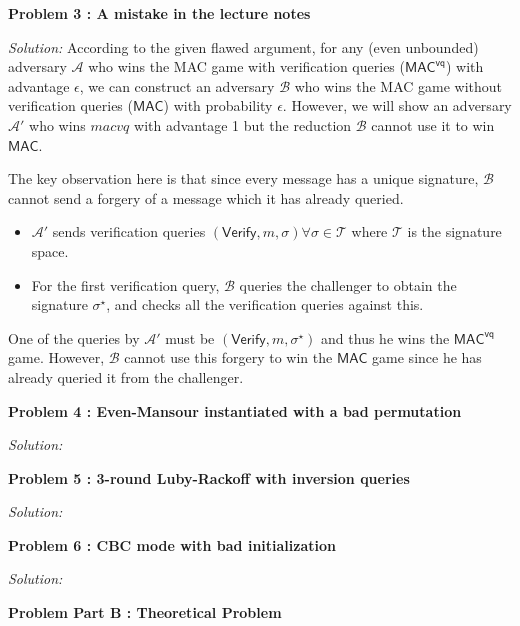 \documentclass[a4paper, 11pt]{article}
\newenvironment{solution}
    {\textit{Solution:}}
    {\clearpage}
\newcommand{\prob}[1]{\begin{mdframed}[backgroundcolor=gray!20] \textbf{Problem #1}\end{mdframed}}
\newcommand{\verify}{\mathsf{Verify}}
\newcommand{\macvq}{\mathsf{MAC^{vq}}}
\newcommand{\mac}{\mathsf{MAC}}
\newcommand{\calA}{\mathcal{A}}
\newcommand{\calB}{\mathcal{B}}
\newcommand{\calT}{\mathcal{T}}
\begin{document}
\prob{3 : A mistake in the lecture notes}
\begin{solution}
    According to the given flawed argument, for any (even unbounded) adversary $\calA$ who wins the MAC game with verification queries ($\macvq$) with advantage $\epsilon$, we can construct an adversary $\calB$ who wins the MAC game without verification queries ($\mac$) with probability $\epsilon$. However, we will show an adversary $\calA'$ who wins  $macvq$ with advantage 1 but the reduction $\calB$ cannot use it to win $\mac$.

    The key observation here is that since every message has a unique signature, $\calB$ cannot send a forgery of a message which it has already queried. 
    \begin{itemize}
        \item $\calA'$ sends verification queries $(\verify , m, \sigma) \forall \sigma\in\calT$ where $\calT$ is the signature space.
        \item For the first verification query, $\calB$ queries the challenger to obtain the signature $\sigma^\star$, and checks all the verification queries against this.
    \end{itemize} 
    One of the queries by $\calA'$ must be $(\verify , m, \sigma^\star)$ and thus he wins the $\macvq$ game. However, $\calB$ cannot use this forgery to win the $\mac$ game since he has already queried it from the challenger.

\end{solution}


\prob{4 : Even-Mansour instantiated with a bad permutation}
\begin{solution}
   
\end{solution}


\prob{5 : 3-round Luby-Rackoff with inversion queries}
\begin{solution}
   
\end{solution}


\prob{6 : CBC mode with bad initialization}
\begin{solution}
   
\end{solution}


\prob{Part B : Theoretical Problem}
\end{document}
